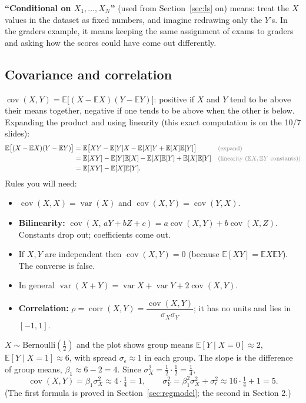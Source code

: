 \documentclass[11pt]{article}
\newcommand{\E}{\mathbb{E}}
\newcommand{\Var}{\operatorname{var}}
\newcommand{\Cov}{\operatorname{cov}}
\newcommand{\corr}{\operatorname{corr}}
\newcommand{\given}{\mid}
\newcommand{\Bern}{\text{Bernoulli}}
\newcommand{\why}[1]{&&\text{\small\color{gray}(#1)}}
\begin{document}
\textbf{``Conditional on $X_1,\dots,X_N$''} (used from Section~\ref{sec:ls} on) means: treat the $X$ values in the dataset as fixed
numbers, and imagine redrawing only the $Y$'s. In the graders example, it means keeping the same assignment of exams to graders and asking
how the scores could have come out differently.

\subsection{Covariance and correlation}
$\Cov(X,Y)=\E\big[(X-\E X)(Y-\E Y)\big]$: positive if $X$ and $Y$ tend to be above their means together, negative if one tends to be above
when the other is below. Expanding the product and using linearity (this exact computation is on the 10/7 slides):
\begin{align*}
\E\big[(X-\E X)(Y-\E Y)\big]&=\E\big[XY-\E[Y]X-\E[X]Y+\E[X]\E[Y]\big] \why{expand}\\
&=\E[XY]-\E[Y]\E[X]-\E[X]\E[Y]+\E[X]\E[Y] \why{linearity ($\E X,\E Y$ constants)}\\
&=\E[XY]-\E[X]\E[Y].
\end{align*}
Rules you will need:
\begin{itemize}[leftmargin=*,itemsep=2pt]
\item $\Cov(X,X)=\Var(X)$ and $\Cov(X,Y)=\Cov(Y,X)$.
\item \textbf{Bilinearity:} $\Cov(X,\,aY+bZ+c)=a\Cov(X,Y)+b\Cov(X,Z)$. Constants drop out; coefficients come out.
\item If $X,Y$ are independent then $\Cov(X,Y)=0$ (because $\E[XY]=\E X\E Y$). The converse is false.
\item In general $\Var(X+Y)=\Var X+\Var Y+2\Cov(X,Y)$.
\item \textbf{Correlation:} $\rho=\corr(X,Y)=\dfrac{\Cov(X,Y)}{\sigma_X\sigma_Y}$; it has no units and lies in $[-1,1]$.
\end{itemize}

\begin{examplebox}[title={Example (Lecture 7): reading covariance off a plot}]
$X\sim\Bern(\tfrac12)$ and the plot shows group means $\E[Y\given X{=}0]\approx2$, $\E[Y\given X{=}1]\approx6$, with spread $\sigma_\epsilon\approx1$
in each group. The slope is the difference of group means, $\beta_1\approx6-2=4$. Since $\sigma_X^2=\tfrac12\cdot\tfrac12=\tfrac14$,
\[
\Cov(X,Y)=\beta_1\sigma_X^2\approx4\cdot\tfrac14=1,\qquad
\sigma_Y^2=\beta_1^2\sigma_X^2+\sigma_\epsilon^2\approx16\cdot\tfrac14+1=5 .
\]
(The first formula is proved in Section~\ref{sec:regmodel}; the second in Section 2.)
\end{examplebox}
\end{document}
